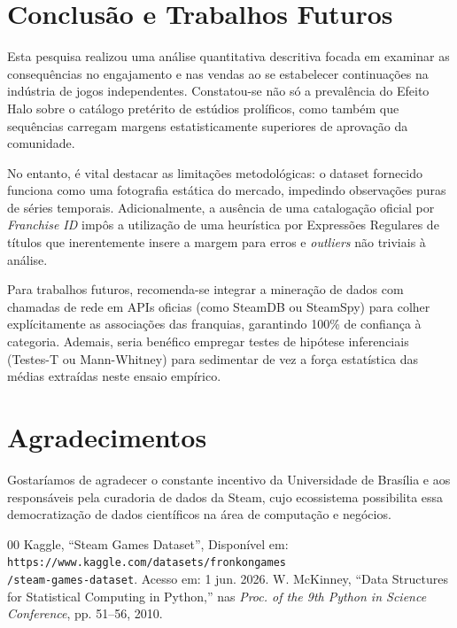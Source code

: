 \documentclass[conference]{IEEEtran}
\begin{document}
\section{Conclusão e Trabalhos Futuros}
Esta pesquisa realizou uma análise quantitativa descritiva 
focada em examinar as consequências no engajamento e nas vendas ao se 
estabelecer continuações na indústria de jogos independentes. 
Constatou-se não só a prevalência do Efeito Halo sobre o catálogo 
pretérito de estúdios prolíficos, como também que sequências 
carregam margens estatisticamente superiores de aprovação da comunidade. 

No entanto, é vital destacar as limitações metodológicas: o dataset 
fornecido funciona como uma fotografia estática do mercado, 
impedindo observações puras de séries temporais. Adicionalmente, 
a ausência de uma catalogação oficial por \textit{Franchise ID} 
impôs a utilização de uma heurística por Expressões Regulares de 
títulos que inerentemente insere a margem para erros e \textit{outliers} 
não triviais à análise.

Para trabalhos futuros, recomenda-se integrar a mineração de dados com 
chamadas de rede em APIs oficias (como SteamDB ou SteamSpy) para colher 
explícitamente as associações das franquias, garantindo 100\% de confiança 
à categoria. Ademais, seria benéfico empregar testes de hipótese 
inferenciais (Testes-T ou Mann-Whitney) para sedimentar de vez a 
força estatística das médias extraídas neste ensaio empírico.

\section*{Agradecimentos}
Gostaríamos de agradecer o constante incentivo da Universidade de 
Brasília e aos responsáveis pela curadoria de dados da Steam, cujo 
ecossistema possibilita essa democratização de dados científicos na 
área de computação e negócios.


\begin{thebibliography}{00}
 Kaggle, ``Steam Games Dataset'', Disponível em: 
\texttt{https://www.kaggle.com/datasets/fronkongames\\/steam-games-dataset}. Acesso em: 1 jun. 2026.
 W. McKinney, ``Data Structures for Statistical Computing in Python,'' nas \textit{Proc. of the 9th Python in Science Conference}, pp. 51--56, 2010.
\end{thebibliography}
\end{document}
